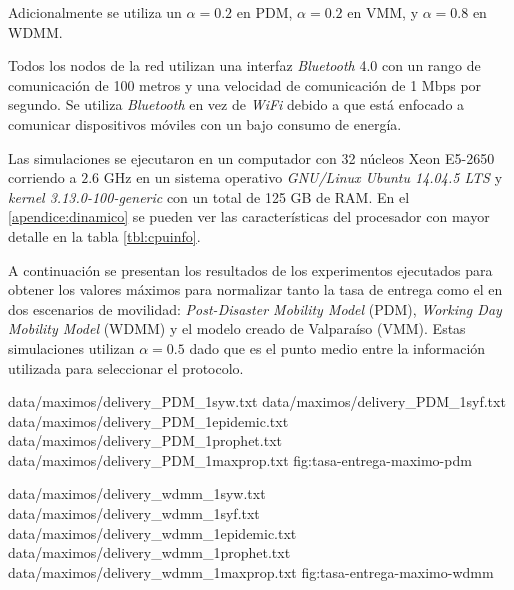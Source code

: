 Adicionalmente se utiliza un $\alpha = 0.2$ en PDM, $\alpha = 0.2$ en VMM, y
$\alpha = 0.8$ en WDMM.



Todos los nodos de la red utilizan una interfaz \textit{Bluetooth} 4.0 con un
rango de comunicación de 100 metros y una velocidad de comunicación de 1 Mbps
por segundo. Se utiliza \textit{Bluetooth} en vez de \textit{WiFi} debido a que
está enfocado a comunicar dispositivos móviles con un bajo consumo de energía.




Las simulaciones se ejecutaron en un computador con 32 núcleos Xeon E5-2650
corriendo a $2.6$ GHz en un sistema operativo \textit{GNU/Linux Ubuntu 14.04.5
LTS} y \textit{kernel 3.13.0-100-generic} con un total de 125 GB de RAM. En el
\ref{apendice:dinamico} se pueden ver las características del procesador con
mayor detalle en la tabla \ref{tbl:cpuinfo}. 












A continuación se presentan los resultados de los experimentos ejecutados para
obtener los valores máximos para normalizar tanto la tasa de entrega como el
\overhead{} en dos escenarios de movilidad: \textit{Post-Disaster Mobility
Model} (PDM), \textit{Working Day Mobility Model} (WDMM) y el modelo creado de
Valparaíso (VMM). Estas simulaciones utilizan $\alpha = 0.5$ dado que es el
punto medio entre la información utilizada para seleccionar el protocolo.







{
{data/maximos/delivery_PDM_1syw.txt}
{data/maximos/delivery_PDM_1syf.txt}
{data/maximos/delivery_PDM_1epidemic.txt}
{data/maximos/delivery_PDM_1prophet.txt}
{data/maximos/delivery_PDM_1maxprop.txt}
}{fig:tasa-entrega-maximo-pdm}


{
{data/maximos/delivery_wdmm_1syw.txt}
{data/maximos/delivery_wdmm_1syf.txt}
{data/maximos/delivery_wdmm_1epidemic.txt}
{data/maximos/delivery_wdmm_1prophet.txt}
{data/maximos/delivery_wdmm_1maxprop.txt}
}{fig:tasa-entrega-maximo-wdmm}



